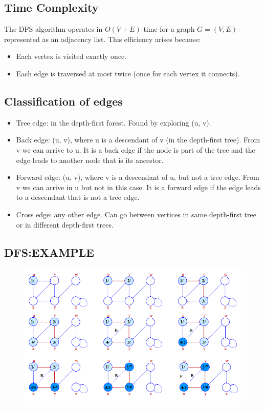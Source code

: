 \subsection{Time Complexity}
The DFS algorithm operates in \(O(V + E)\) time for a graph \(G = (V, E)\) represented as an adjacency list. This efficiency arises because:
\begin{itemize}
    \item Each vertex is visited exactly once.
    \item Each edge is traversed at most twice (once for each vertex it connects).
\end{itemize}

\subsection{Classification of edges}
\begin{itemize}
    \item Tree edge: in the depth-first forest. Found by exploring (u, v). 
    \item Back edge: (u, v), where u is a descendant of v (in the depth-first tree). From v we can arrive to u. It is a back edge if the node is part of the tree and the edge leads to another node that is its ancestor.
    \item  Forward edge: (u, v), where v is a descendant of u, but not a tree edge. From v we can arrive in u but not in this case. It is a forward edge if the edge leads to a descendant that is not a tree edge.
    \item  Cross edge: any other edge. Can go between vertices in same depth-first tree or in different depth-first trees.
\end{itemize}

\subsection{DFS:EXAMPLE}
\begin{figure}[h]
    \centering
    \includegraphics[width=0.75\linewidth]{DFS Example.png}
\end{figure}

